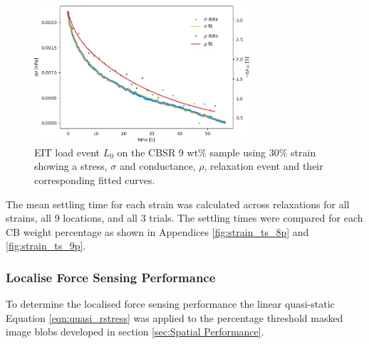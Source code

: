\begin{figure}[H]
    \centering
    \includegraphics[width=8cm]{Figures/2D Push event 0 - CBSR 9 wt 30p strain - 2D compressionv2.jpg}
    \caption{EIT load event $L_0$ on the CBSR 9 wt\% sample using 30\% strain showing a stress, $\sigma$ and conductance, $\rho$, relaxation event and their corresponding fitted curves.}
    \label{fig:blob_global_relaxation}
\end{figure}

The mean settling time for each strain was calculated across relaxations for all strains, all 9 locations, and all 3 trials. The settling times were compared for each CB weight percentage as shown in Appendices \ref{fig:strain_ts_8p} and \ref{fig:strain_ts_9p}.

\subsubsection{Localise Force Sensing Performance}\label{sec:Localised Force Sensing Performance2}
To determine the localised force sensing performance the linear quasi-static Equation \ref{eqn:quasi_rstress} was applied to the percentage threshold masked image blobs developed in section \ref{sec:Spatial Performance}.

